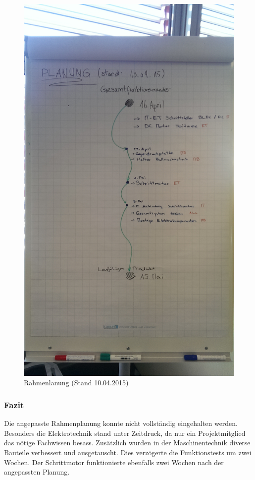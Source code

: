 \begin{figure}[h!]
	\centering
	\includegraphics[width=0.6\linewidth]{../../fig/rahmenplanung-10042015}
	\caption{Rahmenlanung (Stand 10.04.2015)}
	\label{fig:rahmenplanung-10042015}
\end{figure}

\subsubsection{Fazit}

Die angepasste Rahmenplanung konnte nicht vollständig eingehalten werden. Besonders die Elektrotechnik stand unter Zeitdruck, da nur ein Projektmitglied das nötige Fachwissen besass.
Zusätzlich wurden in der Maschinentechnik diverse Bauteile verbessert und ausgetauscht. Dies verzögerte die Funktionstests um zwei Wochen.
Der Schrittmotor funktionierte ebenfalls zwei Wochen nach der angepassten Planung.
